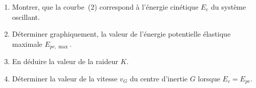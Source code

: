 \begin{enumerate}
    \item Montrer, que la courbe~(2) correspond à l'énergie cinétique $E_{c}$ du
          système oscillant.
    \item Déterminer graphiquement, la valeur de l'énergie potentielle élastique
          maximale $E_{pe,\max}$.
    \item En déduire la valeur de la raideur $K$.
    \item Déterminer la valeur de la vitesse $v_{G}$ du centre d'inertie $G$
          lorsque $E_{c}=E_{pe}$.
\end{enumerate}

